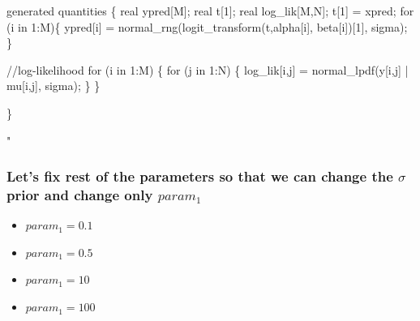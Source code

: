 \documentclass[
]{article}
\newenvironment{Shaded}{\begin{snugshade}}{\end{snugshade}}
\newcommand{\StringTok}[1]{\textcolor[rgb]{0.31,0.60,0.02}{#1}}
\providecommand{\tightlist}{%
  \setlength{\itemsep}{0pt}\setlength{\parskip}{0pt}}
\begin{document}
\begin{Shaded}
\begin{Highlighting}[]
\StringTok{generated quantities \{}
\StringTok{  real ypred[M];}
\StringTok{  real t[1];}
\StringTok{  real log\_lik[M,N];}
\StringTok{  t[1] = xpred;}
\StringTok{  for (i in 1:M)\{}
\StringTok{    ypred[i] = normal\_rng(logit\_transform(t,alpha[i], beta[i])[1], sigma);}
\StringTok{  \}}

\StringTok{  //log{-}likelihood}
\StringTok{  for (i in 1:M) \{}
\StringTok{    for (j in 1:N) \{}
\StringTok{    log\_lik[i,j] = normal\_lpdf(y[i,j] | mu[i,j], sigma);}
\StringTok{    \}}
\StringTok{  \}}

\StringTok{\}}

\StringTok{"}
\end{Highlighting}
\end{Shaded}

\hypertarget{lets-fix-rest-of-the-parameters-so-that-we-can-change-the-sigma-prior-and-change-only-param_1}{%
\subsubsection{\texorpdfstring{Let's fix rest of the parameters so that
we can change the \(\sigma\) prior and change only
\(param_1\)}{Let's fix rest of the parameters so that we can change the \textbackslash sigma prior and change only param\_1}}\label{lets-fix-rest-of-the-parameters-so-that-we-can-change-the-sigma-prior-and-change-only-param_1}}

\begin{itemize}
\tightlist
\item
  \(param_1 = 0.1\)
\item
  \(param_1 = 0.5\)
\item
  \(param_1 = 10\)
\item
  \(param_1 = 100\)
\end{itemize}
\end{document}
